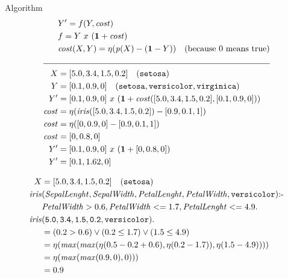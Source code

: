 \documentclass[presentation]{beamer}\mode<presentation>{\usetheme{AMSBolognaFC}}
\begin{document}
\begin{frame}[allowframebreaks]{Algorithm}
    \begin{equation*}
        \centering
        \begin{aligned}
            &Y' = f(Y, \pred{cost})\\
            &f = Y\ x\ (\textbf{1} + \pred{cost})\\
            &\pred{cost}(X,Y) = \eta(\pred{p}(X) - (\textbf{1} - Y))\quad\text{(because 0 means true)}\\
            \cline{1-2}
            X &= [5.0, 3.4, 1.5, 0.2]\quad (\const{setosa})\\
            Y &= [0.1, 0.9, 0]\quad (\const{setosa},\const{versicolor},\const{virginica})\\
            Y' &= [0.1, 0.9, 0]\ x\ (\textbf{1} + \pred{cost}([5.0, 3.4, 1.5, 0.2],[0.1, 0.9, 0]))\\
            \pred{cost} &= \eta(\pred{iris}([5.0, 3.4, 1.5, 0.2]) - [0.9, 0.1, 1])\\
            \pred{cost} &= \eta([0, 0.9, 0] - [0.9, 0.1, 1])\\
            \pred{cost} &= [0, 0.8, 0]\\
            Y' &= [0.1, 0.9, 0]\ x\ (\textbf{1} + [0, 0.8, 0])\\
            Y' &= [0.1, 1.62, 0]\\
        \end{aligned}
    \end{equation*}
    
    \framebreak
    
    \begin{equation*}
        \centering
        \begin{aligned}
            X &= [5.0, 3.4, 1.5, 0.2]\quad (\const{setosa})\\
            \pred{iris}&(\var{SepalLenght}, \var{SepalWidth}, \var{PetalLenght}, \var{PetalWidth}, \const{versicolor}) \text{:-}\\
            &\var{PetalWidth} > 0.6, \var{PetalWidth} <= 1.7, \var{PetalLenght} <= 4.9.\\
            \pred{iris}&(\const{5.0}, \const{3.4}, \const{1.5}, \const{0.2}, \const{versicolor}).\\
            &= (0.2 > 0.6) \vee (0.2 \le 1.7) \vee (1.5 \le 4.9)\\
            &= \eta(\pred{max}(\pred{max}(\eta(0.5 - 0.2 + 0.6), \eta(0.2 - 1.7)), \eta(1.5 - 4.9))))\\
            &= \eta(\pred{max}(\pred{max}(0.9, 0), 0)))\\
            &= 0.9
        \end{aligned}
    \end{equation*}


\end{frame}
\end{document}
